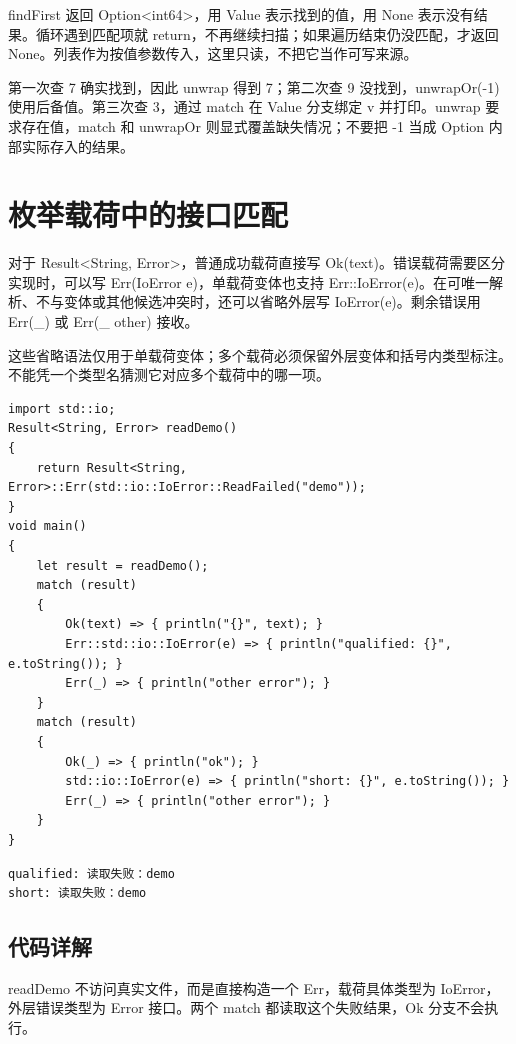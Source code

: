 findFirst 返回 Option<int64>，用 Value 表示找到的值，用 None 表示没有结果。循环遇到匹配项就 return，不再继续扫描；如果遍历结束仍没匹配，才返回 None。列表作为按值参数传入，这里只读，不把它当作可写来源。

第一次查 7 确实找到，因此 unwrap 得到 7；第二次查 9 没找到，unwrapOr(-1) 使用后备值。第三次查 3，通过 match 在 Value 分支绑定 v 并打印。unwrap 要求存在值，match 和 unwrapOr 则显式覆盖缺失情况；不要把 -1 当成 Option 内部实际存入的结果。

\section{枚举载荷中的接口匹配}

对于 Result<String, Error>，普通成功载荷直接写 Ok(text)。错误载荷需要区分实现时，可以写 Err(IoError e)，单载荷变体也支持 Err::IoError(e)。在可唯一解析、不与变体或其他候选冲突时，还可以省略外层写 IoError(e)。剩余错误用 Err(\_) 或 Err(\_ other) 接收。

这些省略语法仅用于单载荷变体；多个载荷必须保留外层变体和括号内类型标注。不能凭一个类型名猜测它对应多个载荷中的哪一项。

\par
\medskip
\begin{lstlisting}[style=chali]
import std::io;
Result<String, Error> readDemo()
{
    return Result<String, Error>::Err(std::io::IoError::ReadFailed("demo"));
}
void main()
{
    let result = readDemo();
    match (result)
    {
        Ok(text) => { println("{}", text); }
        Err::std::io::IoError(e) => { println("qualified: {}", e.toString()); }
        Err(_) => { println("other error"); }
    }
    match (result)
    {
        Ok(_) => { println("ok"); }
        std::io::IoError(e) => { println("short: {}", e.toString()); }
        Err(_) => { println("other error"); }
    }
}
\end{lstlisting}
\par
\medskip

\par
\medskip
\begin{lstlisting}[style=out]
qualified: 读取失败：demo
short: 读取失败：demo
\end{lstlisting}
\par
\medskip

\subsection*{代码详解}

readDemo 不访问真实文件，而是直接构造一个 Err，载荷具体类型为 IoError，外层错误类型为 Error 接口。两个 match 都读取这个失败结果，Ok 分支不会执行。

